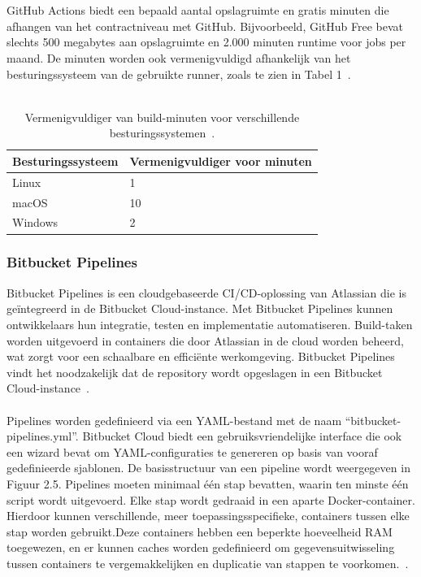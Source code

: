 \\\\
GitHub Actions biedt een bepaald aantal opslagruimte en gratis minuten die afhangen van het contractniveau met GitHub. Bijvoorbeeld, GitHub Free bevat slechts 500 megabytes aan opslagruimte en 2.000 minuten runtime voor jobs per maand. De minuten worden ook vermenigvuldigd afhankelijk van het besturingssysteem van de gebruikte runner, zoals te zien in Tabel 1~\autocite{githubActionsBilling}.
\\\\
\begin{table}[h!]
    \centering
    \begin{tabular}{|l|l|}
        \hline
        \textbf{Besturingssysteem} & \textbf{Vermenigvuldiger voor minuten} \\ \hline
        Linux                       & 1                                     \\ \hline
        macOS                       & 10                                    \\ \hline
        Windows                     & 2                                     \\ \hline
    \end{tabular}
    \caption{Vermenigvuldiger van build-minuten voor verschillende besturingssystemen~\autocite{githubActionsBilling}.}
    \label{tab:minutes_multiplier}
\end{table}

\newpage

\subsubsection{Bitbucket Pipelines}

Bitbucket Pipelines is een cloudgebaseerde CI/CD-oplossing van Atlassian die is geïntegreerd in de Bitbucket Cloud-instance. Met Bitbucket Pipelines kunnen ontwikkelaars hun integratie, testen en implementatie automatiseren. Build-taken worden uitgevoerd in containers die door Atlassian in de cloud worden beheerd, wat zorgt voor een schaalbare en efficiënte werkomgeving. Bitbucket Pipelines vindt het noodzakelijk dat de repository wordt opgeslagen in een Bitbucket Cloud-instance~\autocite{atlassianStarted}.
\\\\
Pipelines worden gedefinieerd via een YAML-bestand met de naam “bitbucket-pipelines.yml”. Bitbucket Cloud biedt een gebruiksvriendelijke interface die ook een wizard bevat om YAML-configuraties te genereren op basis van vooraf gedefinieerde sjablonen. De basisstructuur van een pipeline wordt weergegeven in Figuur 2.5. Pipelines moeten minimaal één stap bevatten, waarin ten minste één script wordt uitgevoerd. Elke stap wordt gedraaid in een aparte Docker-container. Hierdoor kunnen verschillende, meer toepassingsspecifieke, containers tussen elke stap worden gebruikt.Deze containers hebben een beperkte hoeveelheid RAM toegewezen, en er kunnen caches worden gedefinieerd om gegevensuitwisseling tussen containers te vergemakkelijken en duplicatie van stappen te voorkomen.~\autocite{atlassianConfigure}.
\\\\

